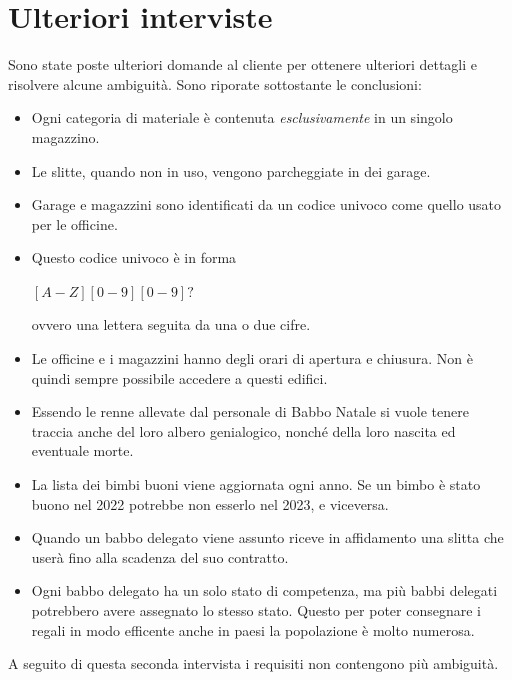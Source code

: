 \documentclass[12pt]{report}
\begin{document}
\section{Ulteriori interviste}
Sono state poste ulteriori domande al cliente per ottenere ulteriori dettagli e
risolvere alcune ambiguità. Sono riporate sottostante le conclusioni:
\begin{itemize}
  \item Ogni categoria di materiale è contenuta \textit{esclusivamente} in un
    singolo magazzino.
  \item Le slitte, quando non in uso, vengono parcheggiate in dei garage.
  \item Garage e magazzini sono identificati da un codice univoco come quello
    usato per le officine.
  \item Questo codice univoco è in forma 
  \begin{center}$[A-Z][0-9][0-9]?$\end{center} ovvero
    una lettera seguita da una o due cifre.
  \item Le officine e i magazzini hanno degli orari di apertura e chiusura. Non è
    quindi sempre possibile accedere a questi edifici.
  \item Essendo le renne allevate dal personale di Babbo Natale 
    si vuole tenere traccia anche del loro albero genialogico, nonché della 
    loro nascita ed eventuale morte.
  \item La lista dei bimbi buoni viene aggiornata ogni anno. Se un bimbo è stato
    buono nel 2022 potrebbe non esserlo nel 2023, e viceversa.
  \item Quando un babbo delegato viene assunto riceve in affidamento una slitta
    che userà fino alla scadenza del suo contratto.
  \item Ogni babbo delegato ha un solo stato di competenza, ma più babbi delegati
    potrebbero avere assegnato lo stesso stato. Questo per poter consegnare i regali
    in modo efficente anche in paesi la popolazione è molto numerosa. 
\end{itemize}

A seguito di questa seconda intervista i requisiti non contengono più ambiguità.
\end{document}
